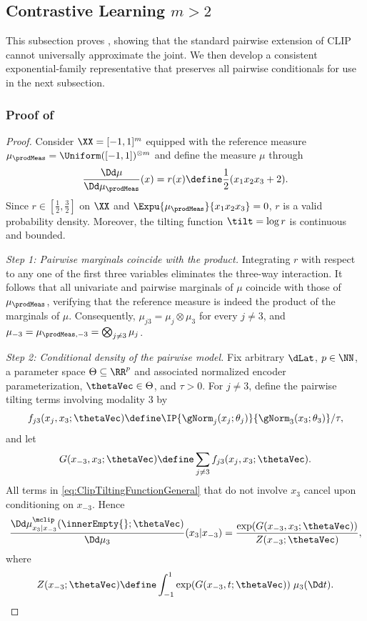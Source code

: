 \documentclass{article}
\begin{document}
\subsection{Contrastive Learning $m>2$}
This subsection proves
 , showing that the standard pairwise
 extension of CLIP cannot universally approximate the joint. 
 We then develop a consistent exponential-family representative that preserves all pairwise
 conditionals for use in the next subsection.

\subsubsection{Proof of }
\label{thm:noUniversalApproximationClip-PROOF}

\begin{proof}
 Consider $\XX=[-1,1]^m$ equipped with the reference measure
 $\mu_\prodMeas=\Uniform([-1,1])^{\otimes m}$ and define the measure $\mu$
 through
 \begin{align*}
  \frac{\Dd \mu}{\Dd \mu_\prodMeas}(x) = r(x)
  \define \frac{1}{2}(x_1 x_2 x_3 + 2).
 \end{align*}
 Since $r \in \left[\frac{1}{2},\frac{3}{2}\right]$ on $\XX$ and
 $\Expu{\mu_\prodMeas}{x_1 x_2 x_3}=0$, $r$ is a valid probability density.
 Moreover, the tilting function $\tilt=\log r$ is continuous and bounded.

 \emph{Step 1: Pairwise marginals coincide with the product.}
 Integrating $r$ with respect to any one of the first three variables
 eliminates the three-way interaction. It follows that all univariate and
 pairwise marginals of $\mu$ coincide with those of $\mu_\prodMeas$, verifying
 that the reference measure is indeed the product of the marginals of $\mu$.
 Consequently, $\mu_{j3}=\mu_j\otimes\mu_3$ for every $j\neq3$, and
 $\mu_{-3}=\mu_{\prodMeas,-3}
  = \bigotimes_{j\neq3}\mu_j$.

 \emph{Step 2: Conditional density of the pairwise model.}
 Fix arbitrary $\dLat$, $p\in\NN$, a parameter space
  $\Theta\subseteq\RR^p$ and associated normalized encoder parameterization,
  $\thetaVec\in\Theta$, and $\tau>0$.
 For $j\neq3$, define the pairwise tilting terms involving modality $3$ by
 \begin{align*}
  f_{j3}(x_j,x_3;\thetaVec)
  \define
  \IP{\gNorm_j(x_j;\theta_j)}{\gNorm_3(x_3;\theta_3)}/\tau,
 \end{align*}
 and let
 \begin{align*}
  G(x_{-3},x_3;\thetaVec)
  \define \sum_{j\neq3} f_{j3}(x_j,x_3;\thetaVec).
 \end{align*}
 All terms in \eqref{eq:ClipTiltingFunctionGeneral} that do not involve
 $x_3$ cancel upon conditioning on $x_{-3}$. Hence
 \begin{align*}
  \frac{\Dd\mu^{\mclip}_{x_3\vert x_{-3}}(\innerEmpty{};\thetaVec)}{\Dd\mu_3}
  (x_3\vert x_{-3})
  = \frac{\exp(G(x_{-3},x_3;\thetaVec))}{Z(x_{-3};\thetaVec)},
 \end{align*}
 where
 \begin{align*}
  Z(x_{-3};\thetaVec)
  \define \int_{-1}^1 \exp(G(x_{-3},t;\thetaVec))\;\mu_3(\Dd t).
 \end{align*}


\end{proof}
\end{document}

